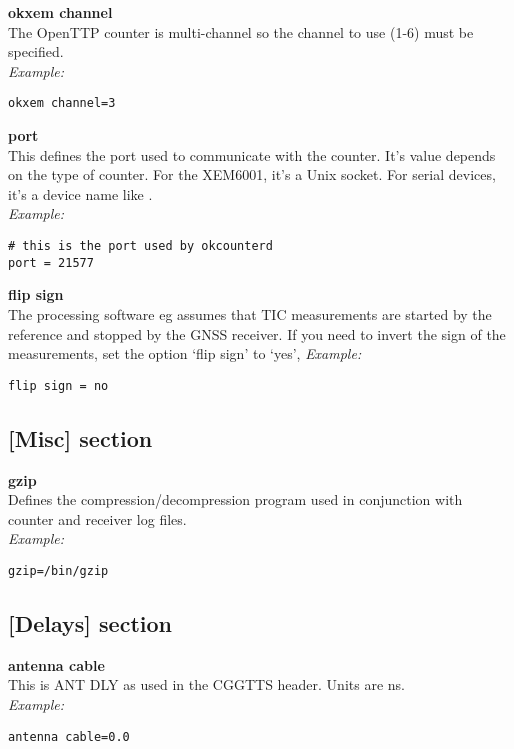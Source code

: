 {\bfseries okxem channel}\\
The OpenTTP counter is multi-channel so the channel to use (1-6) must be specified.\\
\textit{Example:}
\begin{lstlisting}
okxem channel=3
\end{lstlisting}

{\bfseries port}\\
This defines the port used to communicate with the counter. It's value depends on the type of counter. 
For the XEM6001, it's a Unix socket. For serial devices, it's a device name like
.\\
\textit{Example:}
\begin{lstlisting}
# this is the port used by okcounterd
port = 21577 
\end{lstlisting}

{\bfseries flip sign}\\
The processing software eg  assumes that TIC measurements are started by the reference
and stopped by the GNSS receiver. If you need to invert the sign of the measurements, set the option
`flip sign' to `yes',
\textit{Example:}
\begin{lstlisting}
flip sign = no 
\end{lstlisting}

\subsection{[Misc] section}

\hypertarget{h:misc}{}

{\bfseries gzip}\\
Defines the compression/decompression program used in conjunction with counter and receiver log files.\\
\textit{Example:}
\begin{lstlisting}
gzip=/bin/gzip 
\end{lstlisting}

\subsection{[Delays] section}

\hypertarget{h:delays}{}

{\bfseries antenna cable}\\
This is ANT DLY as used in the CGGTTS header. Units are ns.\\
\textit{Example:}
\begin{lstlisting}
antenna cable=0.0
\end{lstlisting}

